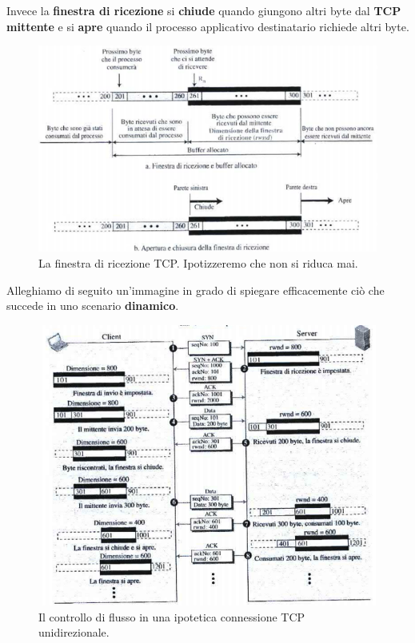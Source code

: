 \documentclass[11pt,a4paper]{article}
\theoremstyle{definition}
\begin{document}
Invece la \textbf{finestra di ricezione} si \textbf{chiude} quando giungono altri byte dal \textbf{TCP mittente} e si \textbf{apre} quando il processo applicativo destinatario richiede altri byte.
\begin{figure}[!h]
	\includegraphics[scale=0.54]{Immagini/Rc_window.png}
	\centering
	\caption{La finestra di ricezione TCP. Ipotizzeremo che non si riduca mai.}
\end{figure}
\newpage
Alleghiamo di seguito un'immagine in grado di spiegare efficacemente ciò che succede in uno scenario \textbf{dinamico}.
\begin{figure}[!h]
	\includegraphics[scale=0.65]{Immagini/Dyn_win.png}
	\centering
	\caption{Il controllo di flusso in una ipotetica connessione TCP unidirezionale.}
\end{figure}\newline
\end{document}
